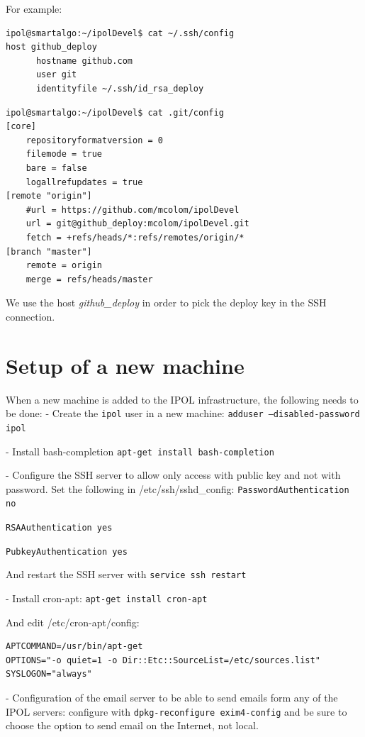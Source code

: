 \documentclass[a4paper,12pt]{article}
\begin{document}
For example:

\begin{verbatim}
ipol@smartalgo:~/ipolDevel$ cat ~/.ssh/config 
host github_deploy
      hostname github.com
      user git
      identityfile ~/.ssh/id_rsa_deploy
\end{verbatim}

\vspace{0.15cm}

\begin{verbatim}
ipol@smartalgo:~/ipolDevel$ cat .git/config 
[core]
	repositoryformatversion = 0
	filemode = true
	bare = false
	logallrefupdates = true
[remote "origin"]
	#url = https://github.com/mcolom/ipolDevel
	url = git@github_deploy:mcolom/ipolDevel.git
	fetch = +refs/heads/*:refs/remotes/origin/*
[branch "master"]
	remote = origin
	merge = refs/heads/master
\end{verbatim}

We use the host \emph{github\_deploy} in order to pick the deploy key in the SSH connection.

\section{Setup of a new machine}
When a new machine is added to the IPOL infrastructure, the following needs to be done:
- Create the {\tt ipol} user in a new machine: {\tt adduser --disabled-password ipol}

- Install bash-completion {\tt apt-get install bash-completion}

- Configure the SSH server to allow only access with public key and not with password. Set the following in /etc/ssh/sshd\_config:
{\tt PasswordAuthentication no}

{\tt RSAAuthentication yes}

{\tt PubkeyAuthentication yes}

And restart the SSH server with {\tt service ssh restart}

- Install cron-apt: {\tt apt-get install cron-apt}

And edit /etc/cron-apt/config:
\begin{verbatim}
APTCOMMAND=/usr/bin/apt-get
OPTIONS="-o quiet=1 -o Dir::Etc::SourceList=/etc/sources.list"
SYSLOGON="always"
\end{verbatim}

- Configuration of the email server to be able to send emails form any of the IPOL servers: configure with {\tt dpkg-reconfigure exim4-config} and be sure to choose the option to send email on the Internet, not local.
\end{document}

